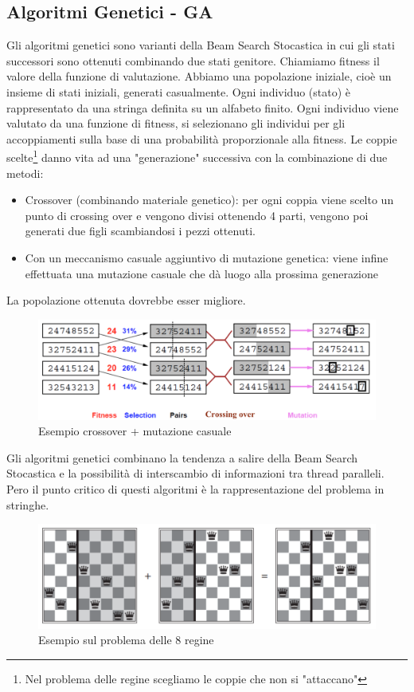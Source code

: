 \documentclass{article}
\begin{document}
\subsection{Algoritmi Genetici - GA}
Gli algoritmi genetici sono varianti della Beam Search Stocastica in cui gli stati successori sono ottenuti combinando due stati genitore. Chiamiamo fitness il valore della funzione di valutazione. \newline
Abbiamo una popolazione iniziale, cioè un insieme di stati iniziali, generati casualmente. Ogni individuo (stato) è rappresentato da una stringa definita su un alfabeto finito. Ogni individuo viene valutato da una funzione di fitness, si selezionano gli individui per gli accoppiamenti sulla base di una probabilità proporzionale alla fitness. Le coppie scelte\footnote{Nel problema delle regine scegliamo le coppie che non si "attaccano"} danno vita ad una "generazione" successiva con la combinazione di due metodi:
\begin{itemize}
    \item Crossover (combinando materiale genetico): per ogni coppia viene scelto un punto di crossing over e vengono divisi ottenendo 4 parti, vengono poi generati due figli scambiandosi i pezzi ottenuti.
    \item Con un meccanismo casuale aggiuntivo di mutazione genetica: viene infine effettuata una mutazione casuale che dà luogo alla prossima generazione
\end{itemize}
La popolazione ottenuta dovrebbe esser migliore.
\begin{figure}[H]
    \centering
    \includegraphics[scale=0.5]{Images/alggeneticicross.png}
    \caption{Esempio crossover + mutazione casuale}
\end{figure}
Gli algoritmi genetici combinano la tendenza a salire della Beam Search Stocastica e la possibilità di interscambio di informazioni tra thread paralleli. Pero il punto critico di questi algoritmi è la rappresentazione del problema in stringhe.
\begin{figure}[H]
    \centering
    \includegraphics[scale=0.5]{Images/alggenscacchi.png}
    \caption{Esempio sul problema delle 8 regine}
\end{figure}
\end{document}
